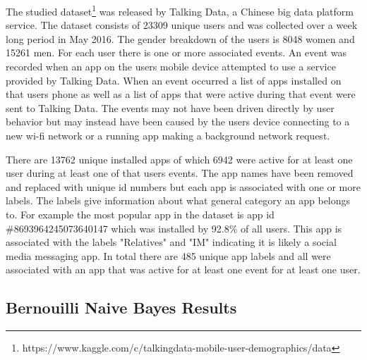 \documentclass[10pt,twocolumn,letterpaper]{article}
\begin{document}
The studied dataset\footnote{https://www.kaggle.com/c/talkingdata-mobile-user-demographics/data} was released by Talking Data, a Chinese big data platform service.  The dataset consists of 23309 unique users and was collected over a week long period in May 2016.  The gender breakdown of the users is 8048 women and 15261 men.  For each user there is one or more associated events.  An event was recorded when an app on the users mobile device attempted to use a service provided by Talking Data.  When an event occurred a list of apps installed on that users phone as well as a list of apps that were active during that event were sent to Talking Data.  The events may not have been driven directly by user behavior but may instead have been caused by the users device connecting to a new wi-fi network or a running app making a background network request.

There are 13762 unique installed apps of which 6942 were active for at least one user during at least one of that users events.  The app names have been removed and replaced with unique id numbers but each app is associated with one or more labels. The labels give information about what general category an app belongs to.  For example the most popular app in the dataset is app id \#8693964245073640147 which was installed by 92.8\% of all users.  This app is associated with the labels "Relatives" and "IM" indicating it is likely a social media messaging app. In total there are 485 unique app labels and all were associated with an app that was active for at least one event for at least one user.

\subsection{Bernouilli Naive Bayes Results}
\end{document}

